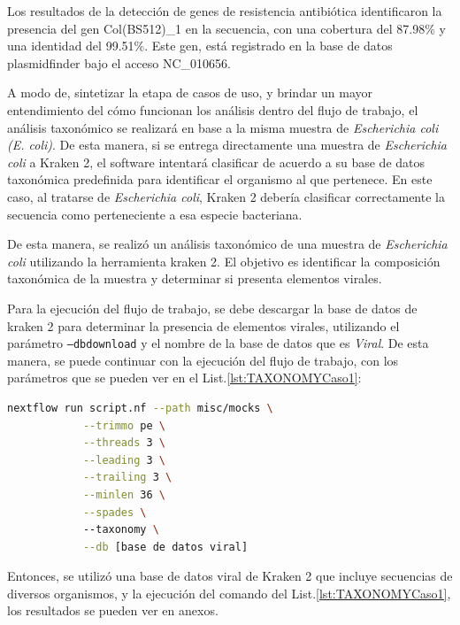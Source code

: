 \documentclass[12pt]{article}
\begin{document}
Los resultados de la detección de genes de resistencia antibiótica 
identificaron la presencia del gen Col(BS512)\_1 en la secuencia, con
una cobertura del 87.98\% y una identidad del 99.51\%. Este gen, 
está registrado en la base de datos plasmidfinder bajo el acceso NC\_010656.

A modo de, sintetizar la etapa de casos de uso, y brindar un mayor 
entendimiento del cómo funcionan los análisis dentro del flujo de 
trabajo, el  análisis taxonómico se realizará en base a la misma 
muestra de \textit{Escherichia coli} \emph{(E. coli)}. De esta manera, si se entrega 
directamente una muestra de \textit{Escherichia coli} a Kraken 2, el software 
intentará clasificar de acuerdo a su base de datos taxonómica predefinida 
para identificar el organismo al que pertenece. En este caso, al tratarse 
de \textit{Escherichia coli}, Kraken 2 debería clasificar correctamente la secuencia 
como perteneciente a esa especie bacteriana. 

De esta manera, se realizó un análisis taxonómico de una muestra de 
\textit{Escherichia coli} utilizando la herramienta kraken 2. El objetivo es 
identificar la composición taxonómica de la muestra y determinar si 
presenta elementos virales.

Para la ejecución del flujo de trabajo, se debe descargar la 
base de datos de kraken 2 para determinar la presencia de elementos 
virales, utilizando el parámetro \texttt{--dbdownload} y el nombre de la base 
de datos que es \emph{Viral}. De esta manera, se puede continuar con la 
ejecución del flujo de trabajo, con los parámetros que se pueden ver 
en el List.\ref{lst:TAXONOMYCaso1}:


\begin{center}
    \begin{lstlisting}[language=bash, caption=Comando para la identificación taxonómica de \textit{Escherichia coli} \emph{(elaboración propia)}., label=lst:TAXONOMYCaso1]
        nextflow run script.nf --path misc/mocks \
            --trimmo pe \
            --threads 3 \
            --leading 3 \
            --trailing 3 \
            --minlen 36 \
            --spades \ 
            --taxonomy \
            --db [base de datos viral]
    \end{lstlisting}
\end{center}


Entonces, se utilizó una base de datos viral de Kraken 2 que 
incluye secuencias de diversos organismos, y la ejecución del 
comando del List.\ref{lst:TAXONOMYCaso1}, los resultados 
se pueden ver en anexos.
\end{document}

